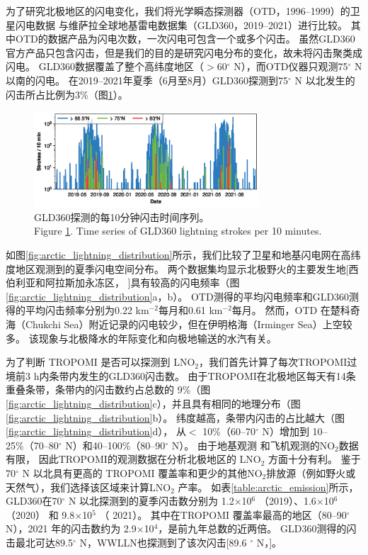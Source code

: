 为了研究北极地区的闪电变化，我们将光学瞬态探测器（OTD，1996--1999）的卫星闪电数据
与维萨拉全球地基雷电数据集（GLD360，2019--2021）进行比较。
其中OTD的数据产品为闪电次数，一次闪电可包含一个或多个闪击。
虽然GLD360官方产品只包含闪击，但是我们的目的是研究闪电分布的变化，故未将闪击聚类成闪电。
GLD360数据覆盖了整个高纬度地区（$>$60$^{\circ}$ N），而OTD仪器只观测75$^{\circ}$ N以南的闪电。
在2019--2021年夏季（6月至8月）GLD360探测到75$^{\circ}$ N 以北发生的闪击所占比例为3\%（图\ref{fig:gld360_tseries}）。

\begin{figure}[H]
\centering
\includegraphics[width=0.75\textwidth]{./figures/arctic_gld360_tseries.png}
\caption{
GLD360探测的每10分钟闪击时间序列。\\
Figure \ref{fig:gld360_tseries}. Time series of GLD360 lightning strokes per 10 minutes.
}
\label{fig:gld360_tseries}
\end{figure}


如图\ref{fig:arctic_lightning_distribution}所示，我们比较了卫星和地基闪电网在高纬度地区观测到的夏季闪电空间分布。
两个数据集均显示北极野火的主要发生地[西伯利亚和阿拉斯加永冻区，
\citep{McCarty.2021}]具有较高的闪电频率（图\ref{fig:arctic_lightning_distribution}a，b）。
OTD测得的平均闪电频率和GLD360测得的平均闪击频率分别为0.22 km$^{-2}$每月和0.61 km$^{-2}$每月。
然而，OTD 在楚科奇海（Chukchi Sea）附近记录的闪电较少，但在伊明格海（Irminger Sea）上空较多。
该现象与北极降水的年际变化和向极地输送的水汽有关\citep{Bintanja.2020}。

为了判断 TROPOMI 是否可以探测到 LNO$_2$，我们首先计算了每次TROPOMI过境前3 h内条带内发生的GLD360闪击数。
由于TROPOMI在北极地区每天有14条重叠条带，条带内的闪击数约占总数的 9\%（图\ref{fig:arctic_lightning_distribution}c），并且具有相同的地理分布（图\ref{fig:arctic_lightning_distribution}b）。
纬度越高，条带内闪击的占比越大（图\ref{fig:arctic_lightning_distribution}d），
从$<$ 10\%（60--70$^{\circ}$ N）增加到 10--25\%（70--80$^{\circ}$ N）和40--100\%（80--90$^{\circ}$ N）。
由于地基观测\citep{Schmale.2018} 和飞机观测\citep{Jacob.2010}的NO$_2$数据有限，
因此TROPOMI的观测数据在分析北极地区的 LNO$_2$ 方面十分有利。
鉴于 70$^{\circ}$ N 以北具有更高的 TROPOMI 覆盖率和更少的其他NO$_2$排放源（例如野火或天然气），我们选择该区域来计算LNO$_2$ 产率。
如表\ref{table:arctic_emission}所示，GLD360在70$^{\circ}$ N 以北探测到的夏季闪击数分别为 1.2$\times$10$^6$ （2019）、1.6$\times$10$^6$ （2020） 和 9.8$\times$10$^5$ （ 2021）。
其中在TROPOMI 覆盖率最高的地区（80--90$^{\circ}$ N），2021 年的闪击数约为 2.9$\times$10$^4$，是前九年总数的近两倍\citep{networktotal.2021}。
GLD360测得的闪击最北可达89.5$^{\circ}$ N，WWLLN也探测到了该次闪击[89.6 $^{\circ}$ N，\citet{Holzworth.2021}]。


